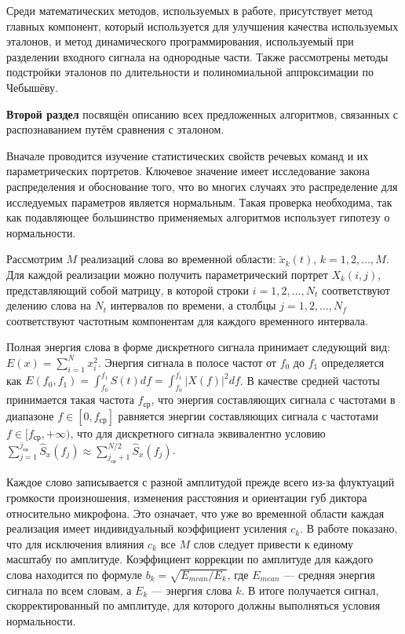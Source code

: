 Среди математических методов, используемых в работе, присутствует метод главных компонент, который используется для улучшения качества используемых эталонов, и метод динамического программирования, используемый при разделении входного сигнала на однородные части.
Также рассмотрены методы подстройки эталонов по длительности и полиномиальной аппроксимации по Чебышёву.

\textbf{Второй раздел} посвящён описанию всех предложенных алгоритмов, связанных с распознаванием путём сравнения с эталоном. 

Вначале проводится изучение статистических свойств речевых команд и их параметрических портретов.
Ключевое значение имеет исследование закона распределения и обоснование того, что во многих случаях это распределение для исследуемых параметров является нормальным.
Такая проверка необходима, так как подавляющее большинство применяемых алгоритмов использует гипотезу о нормальности.

Рассмотрим $M$ реализаций слова во временной области: $\tilde{x}_k (t)$, $k = 1, 2, \dots, M$.
Для каждой реализации можно получить параметрический портрет $X_k (i, j)$, представляющий собой матрицу, в которой строки $i = 1, 2, \dots, N_t$ соответствуют делению слова на $N_t$ интервалов по времени, а столбцы $j = 1, 2, \dots, N_f$ соответствуют частотным компонентам для каждого временного интервала.

Полная энергия слова в форме дискретного сигнала принимает следующий вид: $E(x) = \sum_{i=1}^{N} x_i^2$.
Энергия сигнала в полосе частот от $f_0$ до $f_1$ определяется как $E(f_0, f_1) = \int_{f_0}^{f_1} S(t) df = \int_{f_0}^{f_1} |X(f)|^2 df$.
В качестве средней частоты принимается такая частота $f_{\text{ср}}$, что энергия составляющих сигнала с частотами в диапазоне $f \in [0, f_{\text{ср}}]$ равняется энергии составляющих сигнала с частотами $f \in [f_{\text{ср}}, +\infty)$, что для дискретного сигнала эквивалентно условию $\sum_{j=1}^{j_{\text{ср}}} \widehat{S}_x (f_j) \approx \sum_{j_{\text{ср}}+1}^{N/2} \widehat{S}_x (f_j)$.

Каждое слово записывается с разной амплитудой прежде всего из-за флуктуаций громкости произношения, изменения расстояния и ориентации губ диктора относительно микрофона.
Это означает, что уже во временной области каждая реализация имеет индивидуальный коэффициент усиления $c_k$.
В работе показано, что для исключения влияния $c_k$ все $M$ слов следует привести к единому масштабу по амплитуде.
Коэффициент коррекции по амплитуде для каждого слова находится по формуле $b_k = \sqrt{E_{mean} / E_k}$, где $E_{mean}$ --- средняя энергия сигнала по всем словам, а $E_k$ --- энергия слова $k$.
В итоге получается сигнал, скорректированный по амплитуде, для которого должны выполняться условия нормальности.

